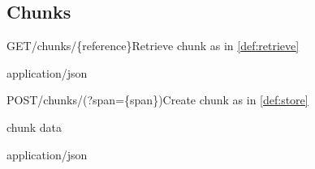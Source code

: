 \subsection{Chunks}

\begin{apiRoute}{GET}{/chunks/\{reference\}}{Retrieve chunk as in \ref{def:retrieve}}
{
}
{ }

\begin{routeParameter} 
\end{routeParameter}
\begin{routeResponse}{application/json}
\end{routeResponse}
\end{apiRoute}




\begin{apiRoute}{POST}{/chunks/(?span=\{span\})}{Create chunk as in \ref{def:store}}
{
}
{ }

\begin{queryParameter} 
\end{queryParameter}

\begin{headerParameter} 
\end{headerParameter}
\begin{requestBody}
chunk data
\end{requestBody}
\begin{routeResponse}{application/json}

\end{routeResponse}
\end{apiRoute}




